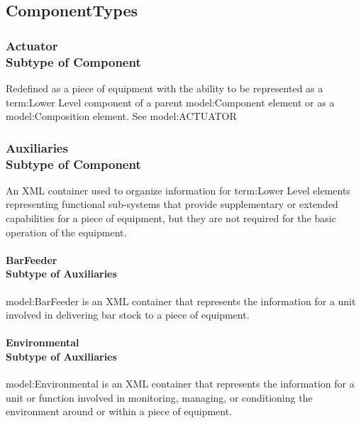 \subsection{ComponentTypes} \label{model:ComponentTypes}
\subsubsection[Actuator]{Actuator \\ {\small Subtype of Component}}
  \label{type:Actuator}

\FloatBarrier

Redefined as a piece of equipment with the ability to be represented as a {term:Lower Level} component of a parent {model:Component} element or as a {model:Composition} element. See {model:ACTUATOR}

\FloatBarrier
\subsubsection[Auxiliaries]{Auxiliaries \\ {\small Subtype of Component}}
  \label{type:Auxiliaries}

\FloatBarrier

An XML container used to organize information for {term:Lower Level} elements representing functional sub-systems that provide supplementary or extended capabilities for a piece of equipment, but they are not required for the basic operation of the equipment.

\paragraph[BarFeeder]{BarFeeder \\ {\small Subtype of Auxiliaries}}\mbox{}
  \label{type:BarFeeder}

\FloatBarrier

{model:BarFeeder} is an XML container that represents the information for a unit involved in delivering bar stock to a piece of equipment.

\paragraph[Environmental]{Environmental \\ {\small Subtype of Auxiliaries}}\mbox{}
  \label{type:Environmental}

\FloatBarrier

{model:Environmental} is an XML container that represents the information for a unit or function involved in monitoring, managing, or conditioning the environment around or within a piece of equipment.

